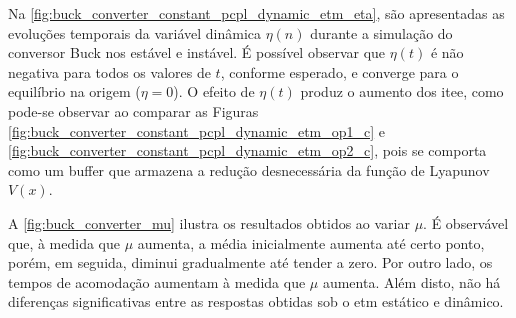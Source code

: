 Na \autoref{fig:buck_converter_constant_pcpl_dynamic_etm_eta}, são apresentadas as evoluções temporais da variável dinâmica $\eta(n)$ durante a simulação do conversor Buck nos  estável e instável. É possível observar que $\eta(t)$ é não negativa para todos os valores de $t$, conforme esperado, e converge para o equilíbrio na origem ($\eta = 0$). O efeito de $\eta(t)$ produz o aumento dos \acrshort{itee}, como pode-se observar ao comparar as Figuras \ref{fig:buck_converter_constant_pcpl_dynamic_etm_op1_c} e \ref{fig:buck_converter_constant_pcpl_dynamic_etm_op2_c}, pois se comporta como um buffer que armazena a redução desnecessária da função de Lyapunov $V(x)$.


A \autoref{fig:buck_converter_mu} ilustra os resultados obtidos ao variar $\mu$. É observável que, à medida que $\mu$ aumenta, a média inicialmente aumenta até certo ponto, porém, em seguida, diminui gradualmente até tender a zero. Por outro lado, os tempos de acomodação aumentam à medida que $\mu$ aumenta. Além disto, não há diferenças significativas entre as respostas obtidas sob o \acrshort{etm} estático e dinâmico.

